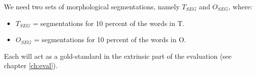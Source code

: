 We need two sets of morphological segmentations, namely $T_{SEG}$ and $O_{SEG}$, where:
\begin{itemize}
\item $T_{SEG}$ = segmentations for 10 percent of the words in T.
\item  $O_{SEG}$ = segmentations for 10 percent of the words in O.
\end{itemize}
Each will act as a gold-standard in the extrinsic 
part of the evaluation (see chapter \ref{ch:eval}). 



